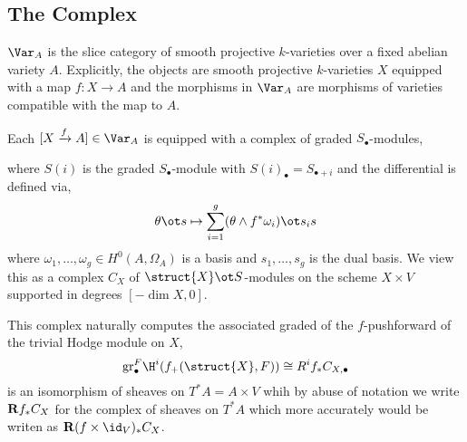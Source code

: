 \documentclass[12pt]{article}
\begin{document}
\subsection{The Complex}

\begin{defn}
$\Var_A$ is the slice category of smooth projective $k$-varieties over a fixed abelian variety $A$. Explicitly, the objects are smooth projective $k$-varieties $X$ equipped with a map $f : X \to A$ and the morphisms in $\Var_A$ are morphisms of varieties compatible with the map to $A$.
\end{defn}

Each $[X \xrightarrow{f} A] \in \Var_A$ is equipped with a complex of graded $S_\bullet$-modules,
\begin{center}
\end{center}
where $S(i)$ is the graded $S_\bullet$-module with $S(i)_{\bullet} = S_{\bullet + i}$ and the differential is defined via,
\[ \theta \ot s \mapsto \sum_{i = 1}^g (\theta \wedge f^* \omega_i) \ot s_i s \]
where $\omega_1, \dots, \omega_g \in H^0(A, \Omega_A)$ is a basis and $s_1, \dots, s_g$ is the dual basis. We view this as a complex $C_X$ of $\struct{X} \ot S$-modules on the scheme $X \times V$ supported in degrees $[-\dim{X}, 0]$.

\renewcommand{\gr}{\mathrm{gr}}

\begin{rmk}
This complex naturally computes the associated graded of the $f$-pushforward of the trivial Hodge module on $X$,
\[ \gr^F_\bullet \H^i(f_+(\struct{X}, F)) \cong R^i f_* C_{X, \bullet} \]
is an isomorphism of sheaves on $T^*A = A \times V$ whih by abuse of notation we write $\mathbf{R} f_* C_X$ for the complex of sheaves on $T^* A$ which more accurately would be writen as $\R (f \times \id_V)_* C_X$.
\end{rmk}

\newcommand{\Lbf}{\mathbf{L}}
\end{document}
